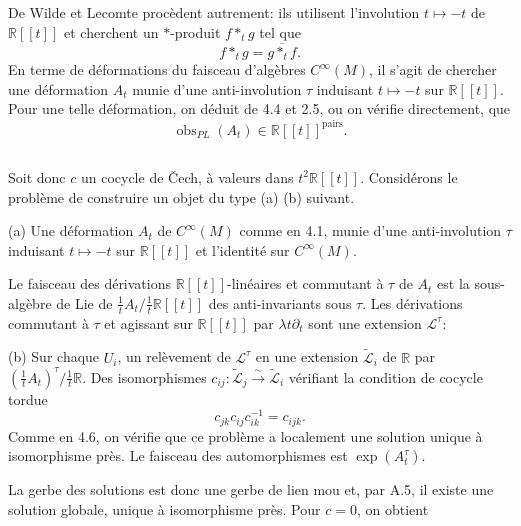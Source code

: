 \documentclass[11pt,a4paper]{article}
\theoremstyle{plain}
\theoremstyle{definition}
\DeclareMathOperator{\obs}{obs}
\newcommand{\R}{\mathbb{R}}
\newcommand{\iso}{\xrightarrow{\sim}}
\begin{document}
\subsection{}
De Wilde et Lecomte proc\`edent autrement: ils utilisent l'involution $t \mapsto -t$
de $\R[[t]]$ et cherchent un $*$-produit $f *_{t} g$ tel que
\[
f *_{t} g = \overline{g *_{t} f}.
\]
En terme de d\'eformations du faisceau d'alg\`ebres $C^{\infty}(M)$, il s'agit de chercher une d\'eformation $A_{t}$ munie d'une anti-involution $\tau$ induisant $t \mapsto -t$ sur $\R[[t]]$. Pour une telle d\'eformation, on d\'eduit de 4.4 et 2.5, ou on v\'erifie directement, que
\[
\obs_{PL}(A_{t}) \in \R[[t]]^{\text{pairs}}.
\]

\subsection{}
Soit donc $c$ un cocycle de \v{C}ech, \`a valeurs dans $t^{2}\R[[t]]$. Consid\'erons le probl\`eme de construire un objet du type (a) (b) suivant.

(a) Une d\'eformation $A_{t}$ de $C^{\infty}(M)$ comme en 4.1, munie d'une anti-involution $\tau$ induisant $t \mapsto -t$ sur $\R[[t]]$ et l'identit\'e sur $C^{\infty}(M)$.

Le faisceau des d\'erivations $\R[[t]]$-lin\'eaires et commutant \`a $\tau$ de $A_{t}$ est la sous-alg\`ebre de Lie de $\tfrac{1}{t}A_{t}/\tfrac{1}{t}\R[[t]]$ des anti-invariants sous $\tau$. Les d\'erivations commutant \`a $\tau$ et agissant sur $\R[[t]]$ par $\lambda t\partial_{t}$ sont une extension $\mathcal{L}^{\tau}$:

(b) Sur chaque $U_{i}$, un rel\`evement de $\mathcal{L}^{\tau}$ en une extension $\widetilde{\mathcal{L}}_{i}$ de $\R$ par $(\tfrac{1}{t}A_{t})^{\tau}/\tfrac{1}{t}\R$. Des isomorphismes $c_{ij}: \widetilde{\mathcal{L}}_{j} \iso \widetilde{\mathcal{L}}_{i}$ v\'erifiant la condition de cocycle tordue
\[
c_{jk} c_{ij} c_{ik}^{-1} = c_{ijk}.
\]
Comme en 4.6, on v\'erifie que ce probl\`eme a localement une solution unique \`a isomorphisme pr\`es. Le faisceau des automorphismes est $\exp(A_{t}^{\tau})$.

La gerbe des solutions est donc une gerbe de lien mou et, par A.5, il existe une solution globale, unique \`a isomorphisme pr\`es.
Pour $c = 0$, on obtient
\end{document}

